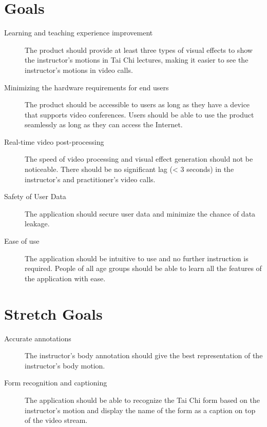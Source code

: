 \documentclass{article}
\begin{document}
\section{Goals}

\begin{description}
\item[Learning and teaching experience improvement] The product should provide at
  least three types of visual effects to show the instructor's motions in Tai
  Chi lectures, making it easier to see the instructor's motions in video calls.
\item[Minimizing the hardware requirements for end users] The product should be
  accessible to users as long as they have a device that supports video
  conferences. Users should be able to use the product seamlessly as long as
  they can access the Internet.
\item[Real-time video post-processing] The speed of video processing and visual
  effect generation should not be noticeable. There should be no significant lag
  (< 3 seconds) in the instructor's and practitioner's video calls.
\item[Safety of User Data] The application should secure user data and minimize the
  chance of data leakage.
\item[Ease of use] The application should be intuitive to use and no further
  instruction is required. People of all age groups should be able to learn all
  the features of the application with ease.
\end{description}

\section{Stretch Goals}

\begin{description}
\item[Accurate annotations] The instructor's body annotation should give the best
  representation of the instructor's body motion.
\item[Form recognition and captioning] The application should be able to recognize
  the Tai Chi form based on the instructor's motion and display the name of the
  form as a caption on top of the video stream.
\end{description}
\end{document}
